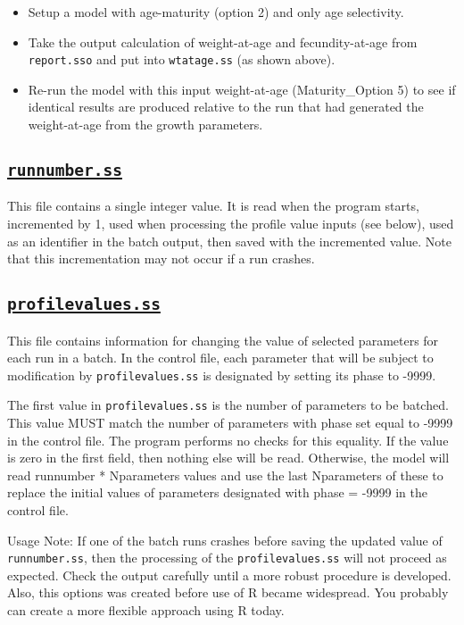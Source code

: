 		\begin{itemize}
			\item Setup a model with age-maturity (option 2) and only age selectivity.
			\item Take the output calculation of weight-at-age and fecundity-at-age  from \verb|report.sso| and put into \verb|wtatage.ss| (as shown above).
			\item Re-run the model with this input weight-at-age (Maturity\_Option 5) to see if identical results are produced relative to the run that had generated the weight-at-age from the growth parameters.
		\end{itemize}


\hypertarget{runnumber}{}
\subsection[\texttt{runnumber.ss}]{\protect\hyperlink{runnumber}{\texttt{runnumber.ss}}}
This file contains a single integer value. It is read when the program starts, incremented by 1, used when processing the profile value inputs (see below), used as an identifier in the batch output, then saved with the incremented value. Note that this incrementation may not occur if a run crashes.

\hypertarget{profilevalues}{}
\subsection[\texttt{profilevalues.ss}]{\protect\hyperlink{profilevalues}{\texttt{profilevalues.ss}}}
This file contains information for changing the value of selected parameters for each run in a batch. In the control file, each parameter that will be subject to modification by \texttt{profilevalues.ss} is designated by setting its phase to -9999.

The first value in \texttt{profilevalues.ss} is the number of parameters to be batched. This value MUST match the number of parameters with phase set equal to -9999 in the control file. The program performs no checks for this equality. If the value is zero in the first field, then nothing else will be read. Otherwise, the model will read runnumber * Nparameters values and use the last Nparameters of these to replace the initial values of parameters designated with phase = -9999 in the control file.

Usage Note: If one of the batch runs crashes before saving the updated value of \texttt{runnumber.ss}, then the processing of the \verb|profilevalues.ss| will not proceed as expected. Check the output carefully until a more robust procedure is developed. Also, this options was created before use of R became widespread. You probably can create a more flexible approach using R today.


\pagebreak